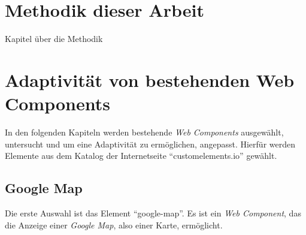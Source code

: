 \documentclass[12pt, paper=a4, bibtotoc, toc=listof, headsepline=true]{scrreprt}
\begin{document}
\chapter{Methodik dieser Arbeit}
Kapitel über die Methodik
	
	
\chapter{Adaptivität von bestehenden Web Components}
	In den folgenden Kapiteln werden bestehende \emph{Web Components} ausgewählt, untersucht und um eine Adaptivität zu ermöglichen, angepasst. Hierfür werden Elemente aus dem Katalog der Internetseite \enquote{customelements.io} gewählt\cite{cusEleIo}.
		\section{Google Map}
			Die erste Auswahl ist das Element \enquote{google-map}. Es ist ein \emph{Web Component}, das die Anzeige einer \emph{Google Map}, also einer Karte, ermöglicht\cite{gooMap}.
\end{document}
